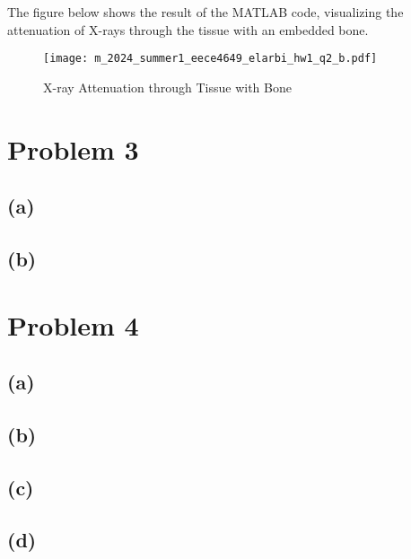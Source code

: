 \documentclass[12pt]{article}
\begin{document}
The figure below shows the result of the MATLAB code, visualizing the attenuation of X-rays through the tissue with an embedded bone.

\begin{figure}[h!]
    \centering
    \texttt{[image: m\_2024\_summer1\_eece4649\_elarbi\_hw1\_q2\_b.pdf]}
    \caption{X-ray Attenuation through Tissue with Bone}
    \label{fig:attenuation}
\end{figure}


\newpage
\section*{Problem 3}
\subsection*{(a)}
\subsection*{(b)}

\newpage
\section*{Problem 4}
\subsection*{(a)}
\subsection*{(b)}
\subsection*{(c)}
\subsection*{(d)}
\end{document}
